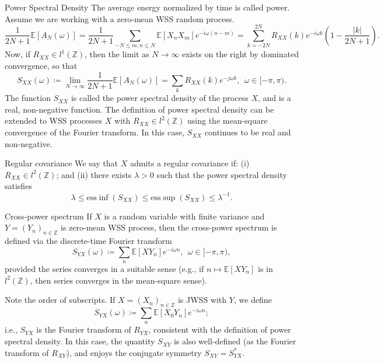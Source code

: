 \documentclass{article}
\begin{document}
\begin{defn}{Power Spectral Density}{}
    The average energy normalized by time is called power. Assume we are working with a zero-mean WSS random process. 
    \[
        \frac{1}{2N + 1} \mathbb{E} [A_{N} (\omega )] = \frac{1}{2N + 1} \sum_{- N\leq m,n \leq N } \mathbb{E} [X_{n} X_{m} ] e^{-i \omega (n - m)}  = \sum_{k = - 2N}^{2N} R_{XX}(k) e^{-i \omega k}\left( 1 - \frac{\left\lvert k \right\rvert }{2N + 1}  \right)    . 
    \]
    Now, if \( R_{ X X} \in l^1(\mathbb{Z} ) \), then the limit as \( N \to  \infty \) exists on the right by dominated convergence, so that 
    \[
        S_{X X} (\omega )\coloneqq \lim_{N \to \infty} \frac{1}{2N + 1}\mathbb{E} [A_{N} (\omega )] = \sum_{k}R_{X X}(k) e^{- j \omega k}, \ \ \omega \in [- \pi ,\pi ).  
    \]
    The function \( S_{X X} \) is called the power spectral density of the process \( X \), and is a real, non-negative function. The definition of power spectral density can be extended to WSS processes \( X \) with \( R_{X X} \in  l^2(\mathbb{Z} ) \) using the mean-square convergence of the Fourier transform. In this case, \( S_{X X} \) continues to be real and non-negative. 
\end{defn}
\begin{defn}{Regular covariance}{}
We say that \( X \) admits a regular covariance if: (i) \( R_{X X } \in l^2(\mathbb{Z} ) \); and (ii) there exists \( \lambda >0 \) such that the power spectral density satisfies
\[
    \lambda \leq \mathrm{ess}\inf (S_{XX}) \leq \mathrm{ess}\sup (S_{XX}) \leq \lambda ^{-1} . 
\]
\end{defn}

\begin{defn}{Cross-power spectrum}{}
If \( X \) is a random variable with finite variance and \( Y = (Y_{n} )_{n \in \mathbb{Z} } \) is zero-mean WSS process, then the cross-power spectrum is defined via the discrete-time Fourier transform
\[
    S_{YX}(\omega ) \coloneqq \sum_{n} \mathbb{E} [XY_{n} ]e^{-i \omega n} , \ \ \omega \in [- \pi ,\pi ),
\] 
provided the series converges in a suitable sense (e.g., if \( n \mapsto \mathbb{E} [XY_{n} ] \) is in \( l^2(\mathbb{Z})  \), then series converges in the mean-square sense).

Note the order of subscripts. If \( X = (X_{n} )_{n \in\mathbb{Z} } \) is JWSS with \( Y \), we define 
\[
    S_{YX}(\omega ) \coloneqq \sum_{n} \mathbb{E} [X_0 Y_{n} ]e^{-i \omega n};
\]
i.e., \( S_{YX}  \) is the Fourier transform of \( R_{YX}  \), consistent with the definition of power spectral density. In this case, the quantity \( S_{XY}  \) is also well-defined (as the Fourier transform of \( R_{XY}  \)), and enjoys the conjugate symmetry \( S_{XY }= S^{\ast} _{YX}  \). 
\end{defn}
\end{document}
